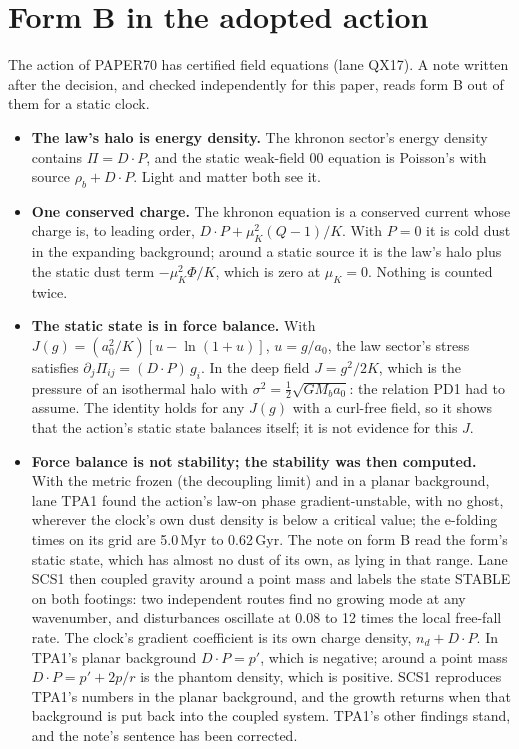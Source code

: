 \documentclass[10pt]{article}
\begin{document}
\section{Form B in the adopted action}
The action of PAPER70 has certified field equations (lane QX17). A note written after the decision, and checked independently for this paper, reads form B out of them for a static clock.
\begin{itemize}
\item \textbf{The law's halo is energy density.} The khronon sector's energy density contains $\Pi=D\!\cdot\!P$, and the static weak-field 00 equation is Poisson's with source $\rho_b+D\!\cdot\!P$. Light and matter both see it.
\item \textbf{One conserved charge.} The khronon equation is a conserved current whose charge is, to leading order, $D\!\cdot\!P+\mu_K^2(Q-1)/K$. With $P=0$ it is cold dust in the expanding background; around a static source it is the law's halo plus the static dust term $-\mu_K^2\Phi/K$, which is zero at $\mu_K=0$. Nothing is counted twice.
\item \textbf{The static state is in force balance.} With $J(g)=(a_0^2/K)[u-\ln(1+u)]$, $u=g/a_0$, the law sector's stress satisfies $\partial_j\Pi_{ij}=(D\!\cdot\!P)\,g_i$. In the deep field $J=g^2/2K$, which is the pressure of an isothermal halo with $\sigma^2=\tfrac12\sqrt{GM_ba_0}$: the relation PD1 had to assume. The identity holds for any $J(g)$ with a curl-free field, so it shows that the action's static state balances itself; it is not evidence for this $J$.
\item \textbf{Force balance is not stability; the stability was then computed.} With the metric frozen (the decoupling limit) and in a planar background, lane TPA1 found the action's law-on phase gradient-unstable, with no ghost, wherever the clock's own dust density is below a critical value; the e-folding times on its grid are 5.0\,Myr to 0.62\,Gyr. The note on form B read the form's static state, which has almost no dust of its own, as lying in that range. Lane SCS1 then coupled gravity around a point mass and labels the state STABLE on both footings: two independent routes find no growing mode at any wavenumber, and disturbances oscillate at 0.08 to 12 times the local free-fall rate. The clock's gradient coefficient is its own charge density, $n_d+D\!\cdot\!P$. In TPA1's planar background $D\!\cdot\!P=p'$, which is negative; around a point mass $D\!\cdot\!P=p'+2p/r$ is the phantom density, which is positive. SCS1 reproduces TPA1's numbers in the planar background, and the growth returns when that background is put back into the coupled system. TPA1's other findings stand, and the note's sentence has been corrected.

\end{itemize}
\end{document}
